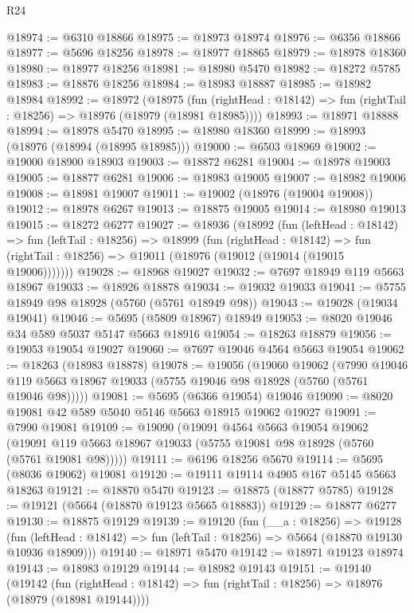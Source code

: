 \begin{lexlean}{R24}
\begin{coremodule}
@18974 := @6310 @18866
@18975 := @18973 @18974
@18976 := @6356 @18866
@18977 := @5696 @18256
@18978 := @18977 @18865
@18979 := @18978 @18360
@18980 := @18977 @18256
@18981 := @18980 @5470
@18982 := @18272 @5785
@18983 := @18876 @18256
@18984 := @18983 @18887
@18985 := @18982 @18984
@18992 := @18972
    (@18975
      (fun (rightHead : @18142) => fun (rightTail : @18256) => @18976 (@18979 (@18981 @18985))))
@18993 := @18971 @18888
@18994 := @18978 @5470
@18995 := @18980 @18360
@18999 := @18993 (@18976 (@18994 (@18995 @18985)))
@19000 := @6503 @18969
@19002 := @19000 @18900 @18903
@19003 := @18872 @6281
@19004 := @18978 @19003
@19005 := @18877 @6281
@19006 := @18983 @19005
@19007 := @18982 @19006
@19008 := @18981 @19007
@19011 := @19002 (@18976 (@19004 @19008))
@19012 := @18978 @6267
@19013 := @18875 @19005
@19014 := @18980 @19013
@19015 := @18272 @6277
@19027 := @18936
    (@18992
      (fun (leftHead : @18142) =>
      fun (leftTail : @18256) =>
      @18999
        (fun (rightHead : @18142) =>
        fun (rightTail : @18256) => @19011 (@18976 (@19012 (@19014 (@19015 @19006)))))))
@19028 := @18968 @19027
@19032 := @7697 @18949 @119 @5663 @18967
@19033 := @18926 @18878
@19034 := @19032 @19033
@19041 := @5755 @18949 @98 @18928 (@5760 (@5761 @18949 @98))
@19043 := @19028 (@19034 @19041)
@19046 := @5695 (@5809 @18967) @18949
@19053 := @8020 @19046 @34 @589 @5037 @5147 @5663 @18916
@19054 := @18263 @18879
@19056 := @19053 @19054 @19027
@19060 := @7697 @19046 @4564 @5663 @19054
@19062 := @18263 (@18983 @18878)
@19078 := @19056
    (@19060
      @19062
      (@7990 @19046 @119 @5663 @18967 @19033 (@5755 @19046 @98 @18928 (@5760 (@5761 @19046 @98)))))
@19081 := @5695 (@6366 @19054) @19046
@19090 := @8020 @19081 @42 @589 @5040 @5146 @5663 @18915 @19062 @19027
@19091 := @7990 @19081
@19109 := @19090
    (@19091
      @4564
      @5663
      @19054
      @19062
      (@19091 @119 @5663 @18967 @19033 (@5755 @19081 @98 @18928 (@5760 (@5761 @19081 @98)))))
@19111 := @6196 @18256 @5670
@19114 := @5695 (@8036 @19062) @19081
@19120 := @19111 @19114 @4905 @167 @5145 @5663 @18263
@19121 := @18870 @5470
@19123 := @18875 (@18877 @5785)
@19128 := @19121 (@5664 (@18870 @19123 @5665 @18883))
@19129 := @18877 @6277
@19130 := @18875 @19129
@19139 := @19120
    (fun (__a : @18256) =>
    @19128
      (fun (leftHead : @18142) => fun (leftTail : @18256) => @5664 (@18870 @19130 @10936 @18909)))
@19140 := @18971 @5470
@19142 := @18971 @19123 @18974
@19143 := @18983 @19129
@19144 := @18982 @19143
@19151 := @19140
    (@19142
      (fun (rightHead : @18142) => fun (rightTail : @18256) => @18976 (@18979 (@18981 @19144))))

\end{coremodule}
\end{lexlean}
